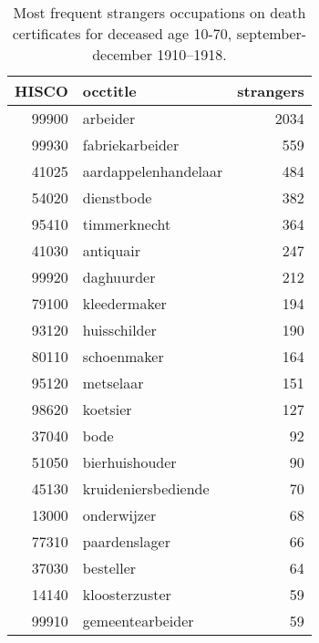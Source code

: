 \begin{table}

\caption{\label{tab:tab:topstrangers}Most frequent strangers occupations on death certificates for deceased age 10-70, september-december 1910–1918.}
\centering
\begin{tabular}[t]{r|l|r}
\hline
HISCO & occtitle & strangers\\
\hline
99900 & arbeider & 2034\\
\hline
99930 & fabriekarbeider & 559\\
\hline
41025 & aardappelenhandelaar & 484\\
\hline
54020 & dienstbode & 382\\
\hline
95410 & timmerknecht & 364\\
\hline
41030 & antiquair & 247\\
\hline
99920 & daghuurder & 212\\
\hline
79100 & kleedermaker & 194\\
\hline
93120 & huisschilder & 190\\
\hline
80110 & schoenmaker & 164\\
\hline
95120 & metselaar & 151\\
\hline
98620 & koetsier & 127\\
\hline
37040 & bode & 92\\
\hline
51050 & bierhuishouder & 90\\
\hline
45130 & kruideniersbediende & 70\\
\hline
13000 & onderwijzer & 68\\
\hline
77310 & paardenslager & 66\\
\hline
37030 & besteller & 64\\
\hline
14140 & kloosterzuster & 59\\
\hline
99910 & gemeentearbeider & 59\\
\hline
\end{tabular}
\end{table}
